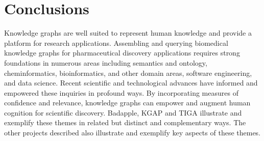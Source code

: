\chapter{Conclusions}

Knowledge graphs are well suited to represent human knowledge and provide a platform for research applications.  Assembling and querying biomedical knowledge graphs for pharmaceutical discovery applications requires strong foundations in numerous areas including semantics and ontology, cheminformatics, bioinformatics, and other domain areas, software engineering, and data science.
Recent scientific and technological advances have informed and empowered these inquiries in profound ways. By incorporating measures of confidence and relevance, knowledge graphs can empower and augment human cognition for scientific discovery. Badapple, KGAP and TIGA illustrate and exemplify these themes in related but distinct and complementary ways. The other projects described also illustrate and exemplify key aspects of these themes.
